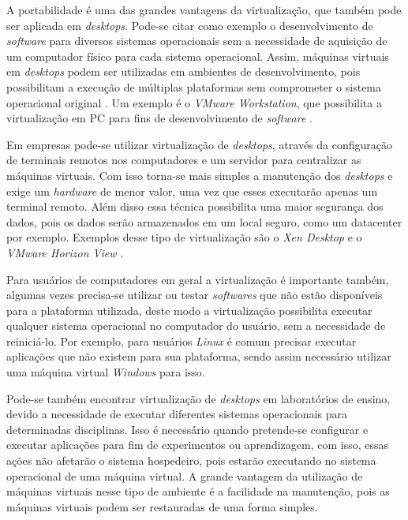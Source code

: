 A portabilidade é uma das grandes vantagens da virtualização, que também pode ser aplicada em \textit{desktops}. Pode-se citar como exemplo 
o desenvolvimento de \textit{software} para diversos sistemas operacionais sem a necessidade de aquisição de um computador físico para cada 
sistema operacional. Assim, máquinas virtuais em \textit{desktops} podem ser utilizadas em ambientes de desenvolvimento, pois possibilitam 
a execução de múltiplas plataformas sem comprometer o sistema operacional original \cite{carissimi2008}. Um exemplo é o 
\textit{VMware Workstation}, que possibilita a virtualização em \ac{PC} para fins de desenvolvimento de \textit{software} \cite{vmware2016}.

Em empresas pode-se utilizar virtualização de \textit{desktops}, através da configuração de terminais remotos nos computadores e um servidor 
para centralizar as máquinas virtuais. Com isso torna-se mais simples a manutenção dos \textit{desktops} e exige um \textit{hardware} de 
menor valor, uma vez que esses executarão apenas um terminal remoto. Além disso essa técnica possibilita uma maior segurança dos dados, pois
os dados serão armazenados em um local seguro, como um datacenter por exemplo. Exemplos desse tipo de virtualização são o \textit{Xen Desktop}
\cite{xendesktop} e o \textit{VMware Horizon View} \cite{vmwareview}.

Para usuários de computadores em geral a virtualização é importante também, algumas vezes precisa-se utilizar ou testar \textit{softwares}
que não estão disponíveis para a plataforma utilizada, deste modo a virtualização possibilita executar qualquer sistema operacional no computador
do usuário, sem a necessidade de reiniciá-lo. Por exemplo, para usuários \textit{Linux} é comum precisar executar aplicações que não existem 
para sua plataforma, sendo assim necessário utilizar uma máquina virtual \textit{Windows} para isso.

Pode-se também encontrar virtualização de \textit{desktops} em laboratórios de ensino, devido a necessidade de executar diferentes sistemas 
operacionais para determinadas disciplinas. Isso é necessário quando pretende-se configurar e executar aplicações para fim de experimentos ou
aprendizagem, com isso, essas ações não afetarão o sistema hospedeiro, pois estarão executando no sistema operacional de uma máquina virtual. 
A grande vantagem da utilização de máquinas virtuais nesse tipo de ambiente é a facilidade na manutenção, pois as máquinas virtuais podem
ser restauradas de uma forma simples.

